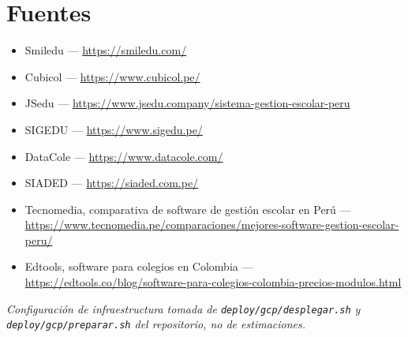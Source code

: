 \documentclass[11pt,a4paper]{article}
\begin{document}
\section*{Fuentes}

\small
\begin{itemize}[leftmargin=1.3em]
  \item Smiledu — \url{https://smiledu.com/}
  \item Cubicol — \url{https://www.cubicol.pe/}
  \item JSedu — \url{https://www.jsedu.company/sistema-gestion-escolar-peru}
  \item SIGEDU — \url{https://www.sigedu.pe/}
  \item DataCole — \url{https://www.datacole.com/}
  \item SIADED — \url{https://siaded.com.pe/}
  \item Tecnomedia, comparativa de software de gestión escolar en Perú —
        \url{https://www.tecnomedia.pe/comparaciones/mejores-software-gestion-escolar-peru/}
  \item Edtools, software para colegios en Colombia —
        \url{https://edtools.co/blog/software-para-colegios-colombia-precios-modulos.html}
\end{itemize}

\vspace{6pt}
\noindent\textit{Configuración de infraestructura tomada de
\texttt{deploy/gcp/desplegar.sh} y \texttt{deploy/gcp/preparar.sh} del
repositorio, no de estimaciones.}
\end{document}
